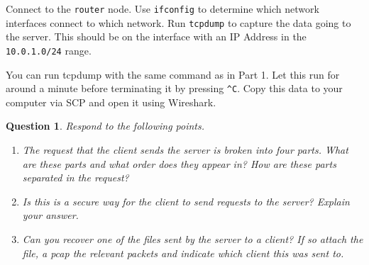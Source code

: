 \documentclass[a4paper,11pt,hidelinks]{article}
\newtheorem{theorem}{Question}[subsection]
\begin{document}
Connect to the \verb=router= node. Use \verb=ifconfig= to determine which network interfaces connect to which network. Run \verb=tcpdump= to capture the data going to the server. This should be on the interface with an IP Address in the \verb=10.0.1.0/24= range. 

You can run tcpdump with the same command as in Part 1. Let this run for around a minute before terminating it by pressing \verb=^C=. Copy this data to your computer via SCP and open it using Wireshark. 

\begin{theorem}
    Respond to the following points.
    \begin{enumerate}
        \item The request that the client sends the server is broken into four parts. What are these parts and what order does they appear in? How are these parts separated in the request?
        \item Is this is a secure way for the client to send requests to the server? Explain your answer.
        \item Can you recover one of the files sent by the server to a client? If so attach the file, a pcap the relevant packets and indicate which client this was sent to.
    \end{enumerate}
\end{theorem}
\end{document}
